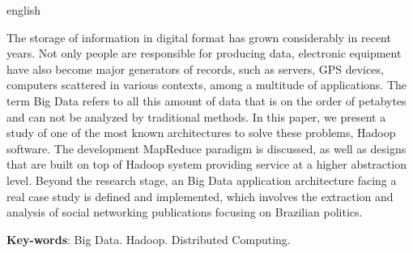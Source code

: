 \begin{resumo}[Abstract]
 \begin{otherlanguage*}{english}

The storage of information in digital format has grown considerably in recent years. Not only people are responsible for producing data, electronic equipment have also become major generators of records, such as servers, GPS devices, computers scattered in various contexts, among a multitude of applications. The term Big Data refers to all this amount of data that is on the order of petabytes and can not be analyzed by traditional methods. In this paper, we present a study of one of the most known architectures to solve these problems, Hadoop software. The development MapReduce paradigm is discussed, as well as designs that are built on top of Hadoop system providing service at a higher abstraction level. Beyond the research stage, an Big Data application architecture facing a real case study is defined and implemented, which involves the extraction and analysis of social networking publications focusing on Brazilian politics.

   \vspace{\onelineskip}
 
   \noindent 
   \textbf{Key-words}: Big Data. Hadoop. Distributed Computing.
 \end{otherlanguage*}
\end{resumo}
